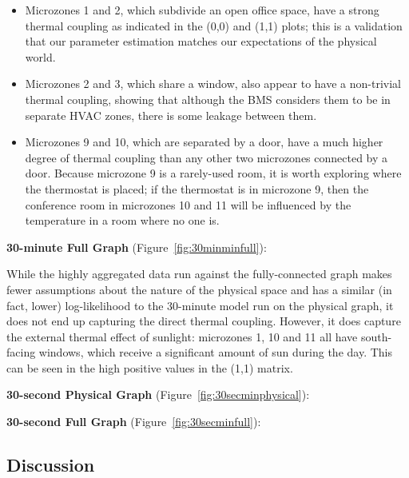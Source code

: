 \begin{itemize}[noitemsep,nolistsep]
\item Microzones 1 and 2, which subdivide an open office space, have a strong thermal coupling as indicated in the (0,0) and (1,1) plots; this is a validation that our parameter estimation matches our expectations of the physical world.
\item Microzones 2 and 3, which share a window, also appear to have a non-trivial thermal coupling, showing that although the BMS considers them to be in separate HVAC zones, there is some leakage between them.
\item Microzones 9 and 10, which are separated by a door, have a much higher degree of thermal coupling than any other two microzones connected by a door.
Because microzone 9 is a rarely-used room, it is worth exploring where the thermostat is placed; if the thermostat is in microzone 9, then the conference room in microzones 10 and 11 will be influenced by the temperature in a room where no one is.
\end{itemize}

\textbf{30-minute Full Graph} (Figure~\ref{fig:30minminfull}):

While the highly aggregated data run against the fully-connected graph makes fewer assumptions about the nature of the physical space and has a similar (in fact, lower) log-likelihood to the 30-minute model run on the physical graph, it does not end up capturing the direct thermal coupling.
However, it does capture the external thermal effect of sunlight: microzones 1, 10 and 11 all have south-facing windows, which receive a significant amount of sun during the day.
This can be seen in the high positive values in the (1,1) matrix.

\textbf{30-second Physical Graph} (Figure~\ref{fig:30secminphysical}):

\textbf{30-second Full Graph} (Figure~\ref{fig:30secminfull}):

\subsection{Discussion}
